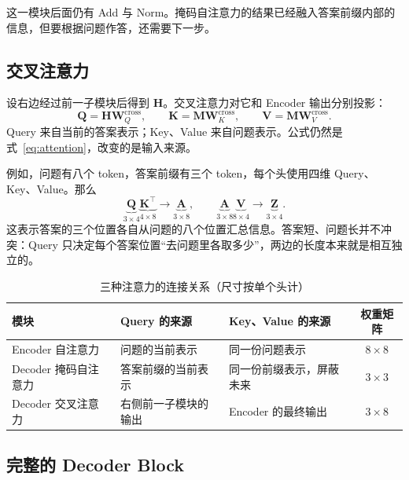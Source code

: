 \documentclass[UTF8,a4paper,12pt]{ctexart}
\numberwithin{equation}{section}
\begin{document}
这一模块后面仍有 Add 与 Norm。掩码自注意力的结果已经融入答案前缀内部的信息，但要根据问题作答，还需要下一步。

\subsection{交叉注意力}

设右边经过前一子模块后得到 $\bm H$。交叉注意力对它和 Encoder 输出分别投影：
\begin{equation}
\bm Q=\bm H\bm W_Q^{\mathrm{cross}},\qquad
\bm K=\bm M\bm W_K^{\mathrm{cross}},\qquad
\bm V=\bm M\bm W_V^{\mathrm{cross}}.
\label{eq:crossqkv}
\end{equation}
Query 来自当前的答案表示；Key、Value 来自问题表示。公式仍然是式~\eqref{eq:attention}，改变的是输入来源。

例如，问题有八个 token，答案前缀有三个 token，每个头使用四维 Query、Key、Value。那么
\begin{equation}
\underbrace{\bm Q}_{3\times4}
\underbrace{\bm K^\top}_{4\times8}
\longrightarrow
\underbrace{\bm A}_{3\times8},
\qquad
\underbrace{\bm A}_{3\times8}
\underbrace{\bm V}_{8\times4}
\longrightarrow
\underbrace{\bm Z}_{3\times4}.
\label{eq:crossshape}
\end{equation}
这表示答案的三个位置各自从问题的八个位置汇总信息。答案短、问题长并不冲突：Query 只决定每个答案位置``去问题里各取多少''，两边的长度本来就是相互独立的。

\begin{table}[htbp]
\centering
\caption{三种注意力的连接关系（尺寸按单个头计）}
\label{tab:threeattentions}
\small\renewcommand{\arraystretch}{1.35}
\begin{tabularx}{\textwidth}{@{}>{\raggedright\arraybackslash}p{3.3cm}YYc@{}}
\toprule
模块 & Query 的来源 & Key、Value 的来源 & 权重矩阵\\
\midrule
Encoder 自注意力 & 问题的当前表示 & 同一份问题表示 & $8\times8$\\
Decoder 掩码自注意力 & 答案前缀的当前表示 & 同一份前缀表示，屏蔽未来 & $3\times3$\\
Decoder 交叉注意力 & 右侧前一子模块的输出 & Encoder 的最终输出 & $3\times8$\\
\bottomrule
\end{tabularx}
\end{table}

\subsection{完整的 Decoder Block}
\end{document}
